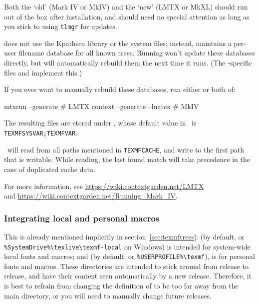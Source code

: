 \documentclass[12pt]{article}
\begin{document}
Both the `old' \ConTeXt{} (Mark IV or MkIV) and the `new' \ConTeXt{}
(LMTX or MkXL) should run out of the box after \TL{} installation,
and should need no special attention as long as you stick to
using \verb+tlmgr+ for updates.

\ConTeXt{} does not use the Kpathsea library or the system 
files; instead, \ConTeXt{} maintains a per-user filename database for
all known trees. Running  won't update these databases
directly, but \ConTeXt{} will automatically rebuild them the next time
it runs. (The \TL-specific files  and
 implement this.)

If you ever want to manually rebuild these databases, run either or both of:
\begin{sverbatim}
mtxrun --generate            # LMTX
context --generate --luatex  # MkIV
\end{sverbatim}
The resulting files are stored under ,
whose default value in \TL\ is \verb+TEXMFSYSVAR;TEXMFVAR+. 

\ConTeXt\ will read from all paths mentioned in \verb+TEXMFCACHE+, and
write to the first path that is writable. While reading, the last found
match will take precedence in the case of duplicated cache data.

For more information, see \url{https://wiki.contextgarden.net/LMTX}\\
and \url{https://wiki.contextgarden.net/Running_Mark_IV}.


\subsubsection{Integrating local and personal macros}
\label{sec:local-personal-macros}

This is already mentioned implicitly in section~\ref{sec:texmftrees}:
 (by default,
 or
\verb|%SystemDrive%\texlive\texmf-local| on Windows)
is intended for system-wide local fonts and macros; and
 (by default,  or
\verb|%USERPROFILE%\texmf|), is for personal fonts and macros.  These
directories are intended to stick around from release to release, and
have their content seen automatically by a new \TL{} release.
Therefore, it is best to refrain from changing the definition of
 to be too far away from the main \TL{} directory,
or you will need to manually change future releases.
\end{document}
